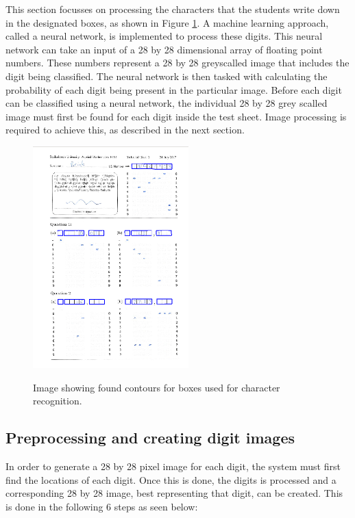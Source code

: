 This section focusses on processing the characters that the students write down in the designated boxes, as shown in Figure \ref{fig:sa}. A machine learning approach, called a neural network, is implemented to process these digits. This neural network can take an input of a 28 by 28 dimensional array of floating point numbers. These numbers represent a 28 by 28 greyscalled image that includes the digit being classified. The neural network is then tasked with calculating the probability of each digit being present in the particular image. Before each digit can be classified using a neural network, the individual 28 by 28 grey scalled image must first be found for each digit inside the test sheet. Image processing is required to achieve this, as described in the next section.
\begin{figure}
  \centering
  \includegraphics[width=6cm]{DigitScan}\\
  \caption{Image showing found contours for boxes used for character recognition.}
  \label{fig:sa}
\end{figure}

\subsection{Preprocessing and creating digit images}
\label{sec:preprocess}

In order to generate a 28 by 28 pixel image for each digit, the system must first find the locations of each digit. Once this is done, the digits is processed and a corresponding 28 by 28 image, best representing that digit, can be created. This is done in the following 6 steps as seen below:


